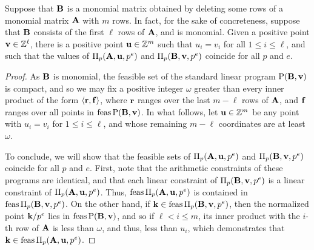 \documentclass{amsart}
\begin{document}
\begin{lemma} 
   \label{lifted-programs: L}
   Suppose that $\mathbf{B}$ is a monomial matrix obtained by deleting some rows of a monomial matrix $\mathbf{A}$ with $m$ rows.
   In fact, for the sake of concreteness, suppose that $\mathbf{B}$ consists of the first $\ell$ rows of $\mathbf{A}$, and is monomial.
   Given a positive point $\mathbf{v} \in \mathbb{Z}^{\ell}$, there is a positive point $\mathbf{u} \in \mathbb{Z}^{m}$ such that $u_i = v_i$ for all $1 \leq i \leq \ell$, and such that the values of $\Pi_p(\mathbf{A}, \mathbf{u}, p^e)$ and $\Pi_p(\mathbf{B}, \mathbf{v}, p^e)$ coincide for all $p$ and $e$.
\end{lemma}

\begin{proof}  As $\mathbf{B}$ is monomial, the feasible set of the standard linear program $\mathrm{P}(\mathbf{B}, \mathbf{v})$ is compact, and so we may fix a positive integer $\omega$ greater than every inner product of the form $\langle \mathbf{r}, \mathbf{f} \rangle$, where $\mathbf{r}$ ranges over the last $m-\ell$ rows of $\mathbf{A}$, and $\mathbf{f}$ ranges over all points in $\operatorname{feas} \mathrm{P}(\mathbf{B},\mathbf{v})$. In what follows, let $\mathbf{u} \in \mathbb{Z}^{m}$ be any point with $u_i = v_i$ for $1 \leq i \leq \ell$, and whose remaining $m-\ell$ coordinates are at least $\omega$. 

To conclude, we will show that the feasible sets of $\Pi_p(\mathbf{A}, \mathbf{u}, p^e)$ and $\Pi_p(\mathbf{B}, \mathbf{v}, p^e)$ coincide for all $p$ and $e$.  First, note that the arithmetic constraints of these programs are identical, and that each linear constraint of $\Pi_p(\mathbf{B}, \mathbf{v}, p^e)$ is a linear constraint of $\Pi_p(\mathbf{A}, \mathbf{u},p^e)$.  Thus, $\operatorname{feas} \Pi_p(\mathbf{A}, \mathbf{u}, p^e)$ is contained in $\operatorname{feas} \Pi_p(\mathbf{B}, \mathbf{v}, p^e)$.  On the other hand, if $\mathbf{k} \in \operatorname{feas} \Pi_p(\mathbf{B}, \mathbf{v}, p^e)$, then the normalized point $\mathbf{k}/p^e$ lies in $\operatorname{feas} \mathrm{P}(\mathbf{B}, \mathbf{v})$, and so if $\ell < i \leq m$, its inner product with the $i$-th row of $\mathbf{A}$ is less than $\omega$, and thus, less than $u_i$, which demonstrates that $\mathbf{k} \in \operatorname{feas} \Pi_p(\mathbf{A}, \mathbf{u}, p^e)$.  
\end{proof}

\end{document}
